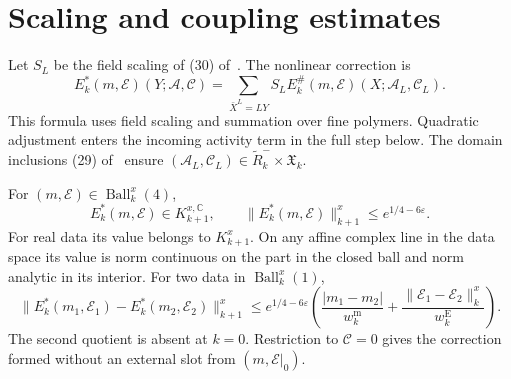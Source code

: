 \documentclass[11pt,letterpaper,reqno]{amsart}
\newcommand{\C}{\mathbb C}
\newcommand{\exteq}[2]{(#1) of~\cite{#2}}
\begin{document}
\section{Scaling and coupling estimates}
\label{subsec:rgnl-scaled-correction}

Let $S_L$ be the field scaling of
\exteq{30}{NormalizedContraction}. The nonlinear correction is
\begin{equation}\label{eq:rgnl-scaled-correction}
 E_k^*(m,\mathscr E)(Y;\mathscr A,\mathscr C)
  =\sum_{\bar X^L=LY}S_L
        E_k^\#(m,\mathscr E)(X;\mathscr A_L,\mathscr C_L).
\end{equation}
This formula uses field scaling and summation over fine
polymers. Quadratic adjustment enters the incoming
activity term in the full step below.
The domain inclusions
\exteq{29}{NormalizedContraction} ensure
$(\mathscr A_L,\mathscr C_L)
\in\widetilde R_k^-\times\mathfrak X_k$.

\begin{proposition}\label{prop:rgnl-scaled-correction}
For $(m,\mathscr E)\in\operatorname{Ball}_k^x(4)$,
\[
 E_k^*(m,\mathscr E)\in K_{k+1}^{x,\C},\qquad
                  \|E_k^*(m,\mathscr E)\|_{k+1}^x
                                      \le e^{1/4-6\varepsilon}.
\]
For real data its value belongs to $K_{k+1}^x$.
On any affine complex line in the data space its value
is norm continuous on the part in the closed ball and
norm analytic in its interior.
For two data in $\operatorname{Ball}_k^x(1)$,
\begin{equation}\label{eq:rgnl-coupling-Lipschitz}
 \|E_k^*(m_1,\mathscr E_1)-E_k^*(m_2,\mathscr E_2)\|_{k+1}^x
 \le e^{1/4-6\varepsilon}
       \left(\frac{|m_1-m_2|}{w_k^{\mathrm m}}
              +\frac{\|\mathscr E_1-\mathscr E_2\|_k^x}
                                                    {w_k^{\mathrm E}}\right).
\end{equation}
The second quotient is absent at $k=0$.
Restriction to $\mathscr C=0$ gives the correction formed
without an external slot from $(m,\mathscr E|_0)$.
\end{proposition}
\end{document}
